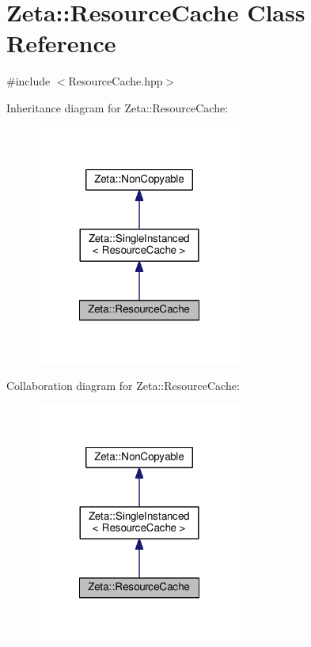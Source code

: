 \hypertarget{classZeta_1_1ResourceCache}{\section{Zeta\+:\+:Resource\+Cache Class Reference}
\label{classZeta_1_1ResourceCache}
}


{\ttfamily \#include $<$Resource\+Cache.\+hpp$>$}



Inheritance diagram for Zeta\+:\+:Resource\+Cache\+:\nopagebreak
\begin{figure}[H]
\begin{center}
\leavevmode
\includegraphics[width=192pt]{classZeta_1_1ResourceCache__inherit__graph}
\end{center}
\end{figure}


Collaboration diagram for Zeta\+:\+:Resource\+Cache\+:\nopagebreak
\begin{figure}[H]
\begin{center}
\leavevmode
\includegraphics[width=192pt]{classZeta_1_1ResourceCache__coll__graph}
\end{center}
\end{figure}
